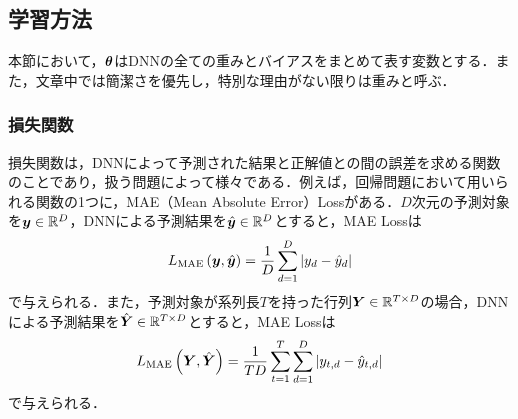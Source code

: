 \subsection{学習方法}
本節において，$\bm{\theta}$はDNNの全ての重みとバイアスをまとめて表す変数とする．また，文章中では簡潔さを優先し，特別な理由がない限りは重みと呼ぶ．

\subsubsection{損失関数}
損失関数は，DNNによって予測された結果と正解値との間の誤差を求める関数のことであり，扱う問題によって様々である．例えば，回帰問題において用いられる関数の1つに，MAE（Mean Absolute Error）Lossがある．$D$次元の予測対象を$\bm{y} \in \mathbb{R}^{D}$，DNNによる予測結果を$\hat{\bm{y}} \in \mathbb{R}^{D}$とすると，MAE Lossは
\begin{equation}
    L_{\text{MAE}}\left(\bm{y}, \hat{\bm{y}}\right) = \frac{1}{D} \sum_{d = 1}^{D}  \left|y_{d} - \hat{y}_{d}\right|
\end{equation}
で与えられる．また，予測対象が系列長$T$を持った行列$\bm{Y} \in \mathbb{R}^{T \times D}$の場合，DNNによる予測結果を$\hat{\bm{Y}} \in \mathbb{R}^{T \times D}$とすると，MAE Lossは
\begin{equation}
    L_{\text{MAE}}\left(\bm{Y}, \hat{\bm{Y}}\right) = \frac{1}{T D} \sum_{t = 1}^{T} \sum_{d = 1}^{D} \left|y_{t, d} - \hat{y}_{t, d}\right|
\end{equation}
で与えられる．

